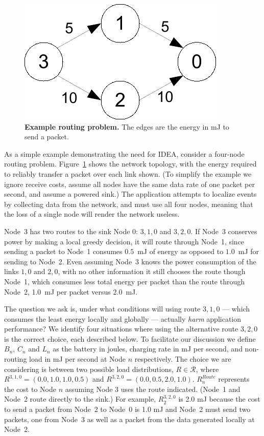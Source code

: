 \begin{figure}[t]
\begin{center}
\includegraphics[width=0.6\hsize]{./5-idea/figs/motivationexample.pdf}
\end{center}
\caption{\textbf{Example routing problem.} The edges are the energy in mJ to
send a packet.}
\label{idea-fig-motivationexample}
\end{figure}

As a simple example demonstrating the need for IDEA, consider a four-node
routing problem. Figure~\ref{idea-fig-motivationexample} shows the network
topology, with the energy required to reliably transfer a packet over each
link shown. (To simplify the example we ignore receive costs, assume all
nodes have the same data rate of one packet per second, and assume a powered
sink.) The application attempts to localize events by collecting data from
the network, and must use all four nodes, meaning that the loss of a single
node will render the network useless.

Node~3 has two routes to the sink Node 0: $3,1,0$ and $3,2,0$. If Node~3
conserves power by making a local greedy decision, it will route through
Node~1, since sending a packet to Node~1 consumes $0.5$~mJ of energy as
opposed to $1.0$~mJ for sending to Node~2. Even assuming Node~3 knows the
power consumption of the links $1,0$ and $2,0$, with no other information it
still chooses the route though Node~1, which consumes less total energy per
packet than the route through Node~2, 1.0~mJ per packet versus 2.0~mJ.

The question we ask is, under what conditions will using route $3,1,0$ ---
which consumes the least energy locally and globally --- actually
\textit{harm} application performance?  We identify four situations where
using the alternative route $3,2,0$ is the correct choice, each described
below. To facilitate our discussion we define $B_n$, $C_n$ and $L_n$ as the
battery in joules, charging rate in mJ per second, and non-routing load in mJ
per second at Node $n$ respectively. The choice we are considering is between
two possible load distributions, $R \in \mathcal{R}$, where $R^{3,1,0} =
(0.0, 1.0, 1.0, 0.5)$ and $R^{3,2,0} = (0.0, 0.5, 2.0, 1.0)$. $R^{Route}_n$
represents the cost to Node $n$ assuming Node 3 uses the route indicated.
(Node~1 and Node~2 route directly to the sink.)  For example, $R^{3,2,0}_2$
is 2.0 mJ because the cost to send a packet from Node~2 to Node~0 is 1.0 mJ
and Node~2 must send two packets, one from Node~3 as well as a packet from
the data generated locally at Node~2.

